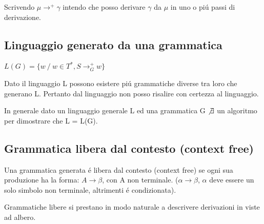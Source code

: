 Scrivendo $\mu \rightarrow ^+ \gamma $ intendo che posso derivare $\gamma$ da $\mu$ in uno o pi\'u passi di derivazione.

\subsection{Linguaggio generato da una grammatica}
\begin{center}
	$L(G) = \{w\ / \ w \in T^*, S \rightarrow ^{+}_{G} w \} $
\end{center}
Dato il linguaggio L possono esistere pi\'u grammatiche diverse tra loro che generano L.
Pertanto dal linguaggio non posso risalire con certezza al linguaggio.

\begin{tcolorbox}\begin{center}
	In generale dato un linguaggio generale L ed una grammatica G $\not\exists$ un algoritmo per dimostrare che L = L(G).
\end{center}\end{tcolorbox}

\subsection{Grammatica libera dal contesto (context free)}
Una grammatica generata \'e libera dal contesto (context free) se ogni sua produzione ha la forma: $A \rightarrow \beta$,
con A non terminale. ($\alpha \rightarrow \beta$, $\alpha$ deve essere un solo simbolo non terminale, altrimenti \'e condizionata).

Grammatiche libere si prestano in modo naturale a descrivere derivazioni in viste ad albero.

